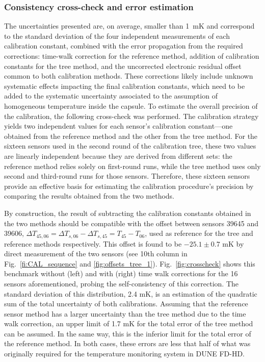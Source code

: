 \subsubsection{Consistency cross-check and error estimation}
\label{sec:crossCheck}
\noindent The uncertainties presented are, on average, smaller than 1~mK and correspond to the standard deviation of the four independent measurements of each calibration constant, combined with the error propagation from the required corrections: time-walk correction for the reference method, addition of calibration constants for the tree method, and the uncorrected electronic residual offset common to both calibration methods. These corrections likely include unknown systematic effects impacting the final calibration constants, which need to be added to the systematic uncertainty associated to the assumption of homogeneous temperature inside the capsule. To estimate the overall precision of the calibration, the following cross-check was performed. The calibration strategy yields two independent values for each sensor’s calibration constant—one obtained from the reference method and the other from the tree method. For the sixteen sensors used in the second round of the calibration tree, these two values are linearly independent because they are derived from different sets: the reference method relies solely on first-round runs, while the tree method uses only second and third-round runs for those sensors. Therefore, these sixteen sensors provide an effective basis for estimating the calibration procedure’s precision by comparing the results obtained from the two methods.

By construction, the result of subtracting the calibration constants obtained in the two methods should be compatible with the offset between sensors 39645 and 39606, $\Delta T_{45,06} = \Delta T_{s,06}-\Delta T_{s,45} = T_{45}-T_{06}$, used as reference for the tree and reference methods respectively. This offset is found to be $-25.1 \pm 0.7$ mK by direct measurement of the two sensors (see 10th column in Fig.~\ref{fi:CAL_sequence} and \ref{fig:offsets_tree_1}).  Fig.~\ref{fig:crosscheck} shows this benchmark without (left) and with (right) time walk corrections for the 16 sensors aforementioned, probing the self-consistency of this correction. The standard deviation of this distribution, 2.4 mK, is an estimation of the quadratic sum of the total uncertainty of both calibrations. Assuming that the reference sensor method has a larger uncertainty than the tree method due to the time walk correction, an upper limit of 1.7 mK for the total error of the tree method can be assumed. In the same way, this is the inferior limit for the total error of the reference method. In both cases, these errors are less that half of what was originally required for the temperature monitoring system in DUNE FD-HD.

